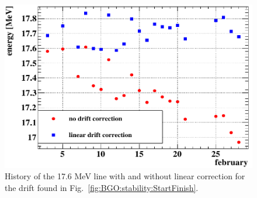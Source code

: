 \begin{refsection}
\begin{figure}
    \centering
    \includegraphics[width=0.9\linewidth]{Figures//X17//BGO/BGO_correction.png}
    \caption[BGO: linear correction to the 17.6 MeV line]{History of the 17.6 MeV line with and without linear correction for the drift found in Fig.~\ref{fig:BGO:stability:StartFinish}.}
    \label{fig:BGO:correction}
\end{figure}


\end{refsection}
